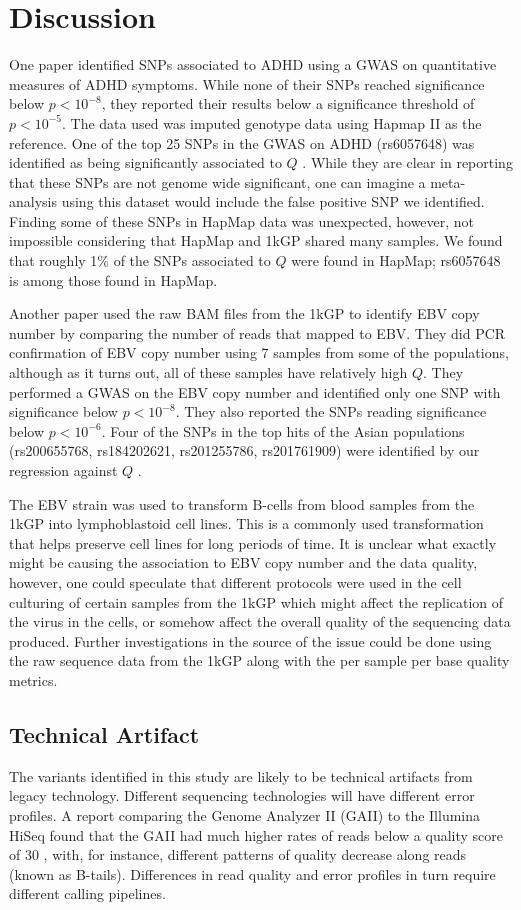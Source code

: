 \documentclass[9pt,lineno]{elife}
\begin{document}
\section{Discussion}
One paper identified SNPs associated to ADHD using a GWAS on quantitative measures of ADHD symptoms.
While none of their SNPs reached significance below $ p < 10^{-8}$, they reported their results below a significance threshold of $ p < 10^{-5}$.
The data used was imputed genotype data using Hapmap II as the reference.
One of the top 25 SNPs in the GWAS on ADHD (rs6057648) was identified as being significantly associated to $Q$ \citep{Ebejer2013}.
While they are clear in reporting that these SNPs are not genome wide significant, one can imagine a meta-analysis using this dataset would include the false positive SNP we identified.
Finding some of these SNPs in HapMap data was unexpected, however, not impossible considering that HapMap and 1kGP shared many samples.
We found that roughly 1\% of the SNPs associated to $Q$ were found in HapMap; rs6057648 is among those found in HapMap.

Another paper used the raw BAM files from the 1kGP to identify EBV copy number by comparing the number of reads that mapped to EBV.
They did PCR confirmation of EBV copy number using 7 samples from some of the populations, although as it turns out, all of these samples have relatively high $Q$.
They performed a GWAS on the EBV copy number and identified only one SNP with significance below $ p < 10^{-8}$. 
They also reported the SNPs reading significance below $ p < 10^{-6}$. 
Four of the SNPs in the top hits of the Asian populations (rs200655768, rs184202621, rs201255786, rs201761909) were identified by our regression against $Q$ \citep{Mandage2017}.

The EBV strain was used to transform B-cells from blood samples from the 1kGP into lymphoblastoid cell lines.
This is a commonly used transformation that helps preserve cell lines for long periods of time.
It is unclear what exactly might be causing the association to EBV copy number and the data quality, however, one could speculate that different protocols were used in the cell culturing of certain samples from the 1kGP which might affect the replication of the virus in the cells, or somehow affect the overall quality of the sequencing data produced.
Further investigations in the source of the issue could be done using the raw sequence data from the 1kGP along with the per sample per base quality metrics. 			

\subsection{Technical Artifact}
The variants identified in this study are likely to be technical artifacts from legacy technology.
Different sequencing technologies will have different error profiles. 
A report comparing the Genome Analyzer II (GAII) to the Illumina HiSeq found that the GAII had much higher rates of reads below a quality score of 30 \citep{Minoche2011}, with, for instance, different patterns of quality decrease along reads (known as B-tails). 
Differences in read quality and error profiles in turn require different calling pipelines.
\end{document}
